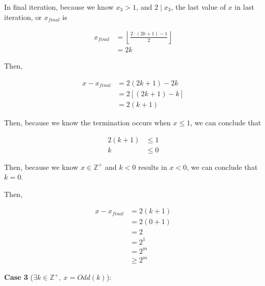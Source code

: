 \documentclass[12pt]{article}
\begin{document}
\begin{enumerate}[a.]
    In final iteration, because we know $x_3 > 1$, and $2 \mid x_3$, the
    last value of $x$ in last iteration, or $x_{final}$ is

    \begin{align}
        x_{final} &= \left\lfloor \frac{2 \cdot (2k + 1) - 1}{2}\right\rfloor\\
        &= 2k
    \end{align}

    \bigskip

    Then,

    \begin{align}
        x - x_{final} &= 2(2k + 1) - 2k\\
        &= 2\left[(2k + 1) - k \right]\\
        &= 2(k + 1)
    \end{align}

    \bigskip

    Then, because we know the termination occurs when $x \leq 1$, we can conclude
    that

    \begin{align}
        2(k+1) &\leq 1\\
        k &\leq 0
    \end{align}

    \bigskip

    Then, because we know $x \in \mathbb{Z}^{+}$ and $k < 0$ results in $x < 0$,
    we can conclude that $k = 0$.

    \bigskip

    Then,

    \begin{align}
        x - x_{final} &= 2(k + 1)\\
        &= 2(0 + 1)\\
        &= 2\\
        &= 2^1\\
        &= 2^m\\
        &\geq 2^m
    \end{align}

    \textbf{Case 3} ($\exists k \in \mathbb{Z}^{+},\:x = Odd(k)$):


\end{enumerate}
\end{document}
